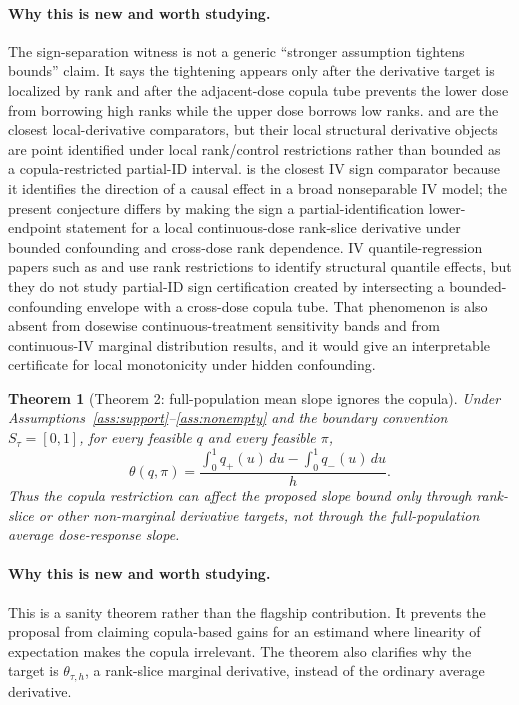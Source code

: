 \documentclass[11pt]{article}
\theoremstyle{definition}
\theoremstyle{plain}
\newtheorem{theorem}{Theorem}
\theoremstyle{remark}
\begin{document}
\paragraph{Why this is new and worth studying.}
The sign-separation witness is not a generic ``stronger assumption tightens bounds'' claim.  It says the tightening appears only after the derivative target is localized by rank and after the adjacent-dose copula tube prevents the lower dose from borrowing high ranks while the upper dose borrows low ranks.  \citet{Chesher2003} and \citet{Jun2009} are the closest local-derivative comparators, but their local structural derivative objects are point identified under local rank/control restrictions rather than bounded as a copula-restricted partial-ID interval.  \citet{Kline2016} is the closest IV sign comparator because it identifies the direction of a causal effect in a broad nonseparable IV model; the present conjecture differs by making the sign a partial-identification lower-endpoint statement for a local continuous-dose rank-slice derivative under bounded confounding and cross-dose rank dependence.  IV quantile-regression papers such as \citet{ChernozhukovHansen2005} and \citet{ChernozhukovHansen2006} use rank restrictions to identify structural quantile effects, but they do not study partial-ID sign certification created by intersecting a bounded-confounding envelope with a cross-dose copula tube.  That phenomenon is also absent from dosewise continuous-treatment sensitivity bands and from continuous-IV marginal distribution results, and it would give an interpretable certificate for local monotonicity under hidden confounding.

\begin{theorem}[Theorem 2: full-population mean slope ignores the copula]\label{thm:mean-collapse}
Under Assumptions~\ref{ass:support}--\ref{ass:nonempty} and the boundary convention \(S_\tau=[0,1]\), for every feasible \(q\) and every feasible \(\pi\),
\[
\theta(q,\pi)=\frac{\int_0^1 q_+(u)\,du-\int_0^1 q_-(u)\,du}{h}.
\]
Thus the copula restriction can affect the proposed slope bound only through rank-slice or other non-marginal derivative targets, not through the full-population average dose-response slope.
\end{theorem}

\paragraph{Why this is new and worth studying.}
This is a sanity theorem rather than the flagship contribution.  It prevents the proposal from claiming copula-based gains for an estimand where linearity of expectation makes the copula irrelevant.  The theorem also clarifies why the target is \(\theta_{\tau,h}\), a rank-slice marginal derivative, instead of the ordinary average derivative.
\end{document}
